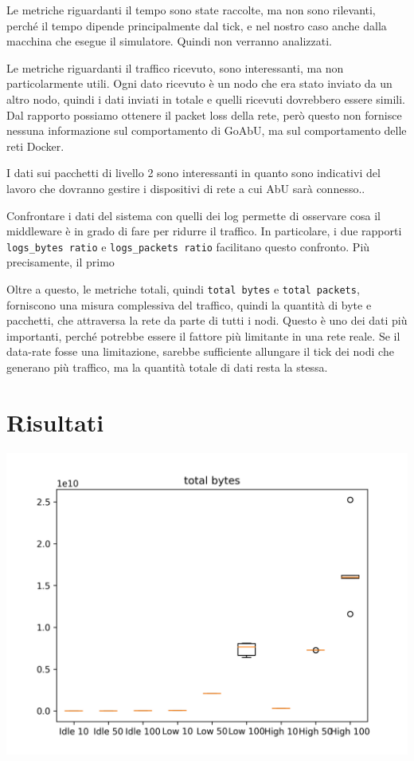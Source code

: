 \documentclass[12pt, a4paper]{article}
\begin{document}
Le metriche riguardanti il tempo sono state raccolte, ma non sono rilevanti, perché il tempo dipende principalmente dal tick, e nel nostro caso anche dalla macchina che esegue il simulatore. Quindi non verranno analizzati.

Le metriche riguardanti il traffico ricevuto, sono interessanti, ma non particolarmente utili. Ogni dato ricevuto è un nodo che era stato inviato da un altro nodo, quindi i dati inviati in totale e quelli ricevuti dovrebbero essere simili.
Dal rapporto possiamo ottenere il packet loss della rete, però questo non fornisce nessuna informazione sul comportamento di GoAbU, ma sul comportamento delle reti Docker.

I dati sui pacchetti di livello 2 sono interessanti in quanto sono indicativi del lavoro che dovranno gestire i dispositivi di rete a cui AbU sarà connesso..

Confrontare i dati del sistema con quelli dei log permette di osservare cosa il middleware è in grado di fare per ridurre il traffico. In particolare, i due rapporti \lstinline{logs_bytes ratio} e \lstinline{logs_packets ratio} facilitano questo confronto.
Più precisamente, il primo 

Oltre a questo, le metriche totali, quindi \lstinline{total bytes} e \lstinline{total packets}, forniscono una misura complessiva del traffico, quindi la quantità di byte e pacchetti, che attraversa la rete da parte di tutti i nodi.
Questo è uno dei dati più importanti, perché potrebbe essere il fattore più limitante in una rete reale. Se il data-rate fosse una limitazione, sarebbe sufficiente allungare il tick dei nodi che generano più traffico, ma la quantità totale di dati resta la stessa.

\section{Risultati}

\includegraphics{graphs/total bytes.png}\label{graphs:tb}
\end{document}
